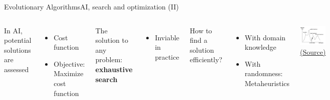 \documentclass[10pt,compress]{beamer} %
\begin{document}
\begin{frame}{Evolutionary Algorithms}{AI, search and optimization (II)}
    \begin{columns}
	In AI, potential solutions are assessed
	\begin{itemize}
		\item Cost function
		\item Objective: Maximize cost function
	\end{itemize}
	The solution to any problem: \textbf{exhaustive search}
	\begin{itemize}
	\item Inviable in practice
	\end{itemize}
	How to find a solution efficiently?
	\begin{itemize}
		\item With domain knowledge
		\item With randomness: \alert{Metaheuristics}
	\end{itemize}

	\begin{center}
		\includegraphics[width=\linewidth]{figs/landscape.png}\\
		\tiny{\href{http://www.handmade-insights.com/blog/2013/genetic-algorithmslandscape}{(Source)}}\\
	\end{center}
	\end{columns}
\end{frame}
\end{document}
